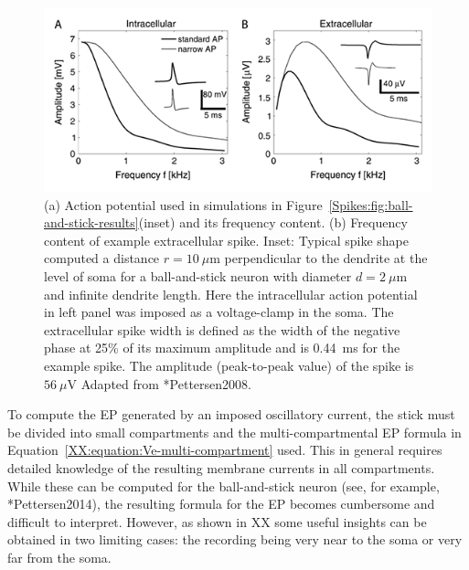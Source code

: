 \begin{figure}[!ht]
\begin{center}
\includegraphics{Figures/Spikes/Spikes-ball-and-stick-frequency-w90-r150}
\end{center}
\caption[]{(a) Action potential used in simulations in Figure~\ref{Spikes:fig:ball-and-stick-results}(inset) 
and its frequency content.
(b) Frequency content of example extracellular spike.
Inset: Typical spike shape computed a distance $r=10~\mu$m
perpendicular to the dendrite at the level of soma for a ball-and-stick 
neuron with diameter $d=2~\mu$m and infinite dendrite length.
Here the intracellular action potential in left panel was imposed as a voltage-clamp in the soma.
The extracellular spike width is defined as the width of the negative phase at 25\% of its maximum
amplitude and is 0.44~ms for the example spike.
The amplitude (peak-to-peak value) of the spike is $56~\mu$V  
Adapted from \citeasnoun**{Pettersen2008}.}
\label{Spikes:fig:ball-and-stick-frequency}
\end{figure}

To compute the EP generated by an imposed oscillatory current, the stick must be divided into small compartments  
and the multi-compartmental EP formula in Equation~\ref{XX:equation:Ve-multi-compartment} used. 
This in general requires detailed knowledge of the resulting membrane currents in all compartments. 
While these can be computed for the ball-and-stick neuron (see, for example, \citeasnoun**{Pettersen2014}), 
the resulting formula for the EP becomes cumbersome and difficult to interpret. 
However, as shown in XX
some useful insights can be obtained in two limiting cases: the recording being very near to the soma or very far from the soma.

